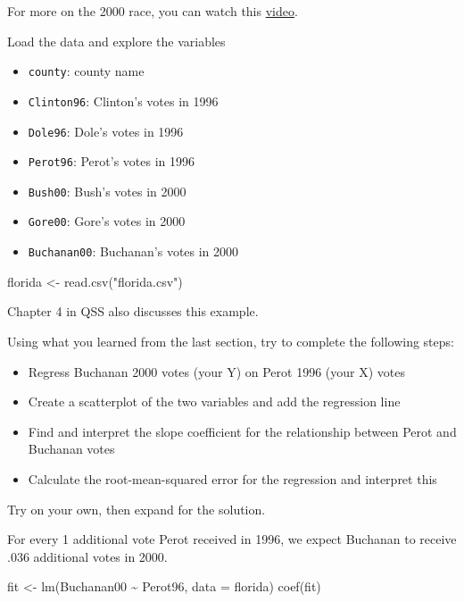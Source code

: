 \documentclass[
  letterpaper,
  DIV=11,
  numbers=noendperiod]{scrreprt}
\newenvironment{Shaded}{\begin{snugshade}}{\end{snugshade}}
\newcommand{\AttributeTok}[1]{\textcolor[rgb]{0.40,0.45,0.13}{#1}}
\newcommand{\FunctionTok}[1]{\textcolor[rgb]{0.28,0.35,0.67}{#1}}
\newcommand{\NormalTok}[1]{\textcolor[rgb]{0.00,0.23,0.31}{#1}}
\newcommand{\OtherTok}[1]{\textcolor[rgb]{0.00,0.23,0.31}{#1}}
\newcommand{\SpecialCharTok}[1]{\textcolor[rgb]{0.37,0.37,0.37}{#1}}
\newcommand{\StringTok}[1]{\textcolor[rgb]{0.13,0.47,0.30}{#1}}
\providecommand{\tightlist}{%
  \setlength{\itemsep}{0pt}\setlength{\parskip}{0pt}}\usepackage{longtable,booktabs,array}
\begin{document}
For more on the 2000 race, you can watch this
\href{https://www.youtube.com/watch?v=D-nR_hmS6V0\&ab_channel=HISTORY}{video}.

Load the data and explore the variables

\begin{itemize}
\tightlist
\item
  \texttt{county}: county name
\item
  \texttt{Clinton96}: Clinton's votes in 1996
\item
  \texttt{Dole96}: Dole's votes in 1996
\item
  \texttt{Perot96}: Perot's votes in 1996
\item
  \texttt{Bush00}: Bush's votes in 2000
\item
  \texttt{Gore00}: Gore's votes in 2000
\item
  \texttt{Buchanan00}: Buchanan's votes in 2000
\end{itemize}

\begin{Shaded}
\begin{Highlighting}[]
\NormalTok{florida }\OtherTok{\textless{}{-}} \FunctionTok{read.csv}\NormalTok{(}\StringTok{"florida.csv"}\NormalTok{)}
\end{Highlighting}
\end{Shaded}

Chapter 4 in QSS also discusses this example.

Using what you learned from the last section, try to complete the
following steps:

\begin{itemize}
\tightlist
\item
  Regress Buchanan 2000 votes (your Y) on Perot 1996 (your X) votes
\item
  Create a scatterplot of the two variables and add the regression line
\item
  Find and interpret the slope coefficient for the relationship between
  Perot and Buchanan votes
\item
  Calculate the root-mean-squared error for the regression and interpret
  this
\end{itemize}

Try on your own, then expand for the solution.

For every 1 additional vote Perot received in 1996, we expect Buchanan
to receive .036 additional votes in 2000.

\begin{Shaded}
\begin{Highlighting}[]
\NormalTok{fit }\OtherTok{\textless{}{-}} \FunctionTok{lm}\NormalTok{(Buchanan00 }\SpecialCharTok{\textasciitilde{}}\NormalTok{ Perot96, }\AttributeTok{data =}\NormalTok{ florida)}
\FunctionTok{coef}\NormalTok{(fit)}
\end{Highlighting}
\end{Shaded}
\end{document}
